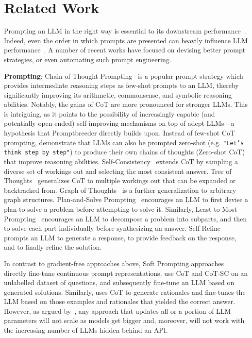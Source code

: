 \documentclass{article} %
\newcommand{\prompt}[1]{\footnotesize{\texttt{"#1"}}\normalsize}
\begin{document}
\section{Related Work}


Prompting an LLM in the right way is essential to its downstream performance~\citep{DBLP:conf/emnlp/MoradiS21,DBLP:journals/corr/abs-2209-07686,zhou2022large}. Indeed, even the order in which prompts are presented can heavily influence LLM performance~\citep{DBLP:conf/acl/LuBM0S22}. A number of recent works have focused on devising better prompt strategies, or even automating such prompt engineering.

\textbf{Prompting}:
Chain-of-Thought Prompting~\citep[CoT,][]{DBLP:conf/nips/Wei0SBIXCLZ22} is a popular prompt strategy which provides intermediate reasoning steps as few-shot prompts to an LLM, thereby significantly improving its arithmetic, commonsense, and symbolic reasoning abilities. Notably, the gains of CoT are more pronounced for stronger LLMs. This is intriguing, as it points to the possibility of increasingly capable (and potentially open-ended) self-improving mechanisms on top of adept LLMs---a hypothesis that Promptbreeder directly builds upon. Instead of few-shot CoT prompting, \cite{DBLP:conf/nips/KojimaGRMI22} demonstrate that LLMs can also be prompted zero-shot (e.g. \prompt{Let's think step by step}) to produce their own chains of thoughts (Zero-shot CoT) that improve reasoning abilities. Self-Consistency~\citep[CoT-SC,][]{wang2022self} extends CoT by sampling a diverse set of workings out and selecting the most consistent answer. Tree of Thoughts~\citep[ToT,][]{yao2023tree} generalizes CoT to multiple workings out that can be expanded or backtracked from. Graph of Thoughts~\citep[GoT,][]{DBLP:journals/corr/abs-2308-09687} is a further generalization to arbitrary graph structures. Plan-and-Solve Prompting~\citep[PS,][]{DBLP:conf/acl/WangXLHLLL23} encourages an LLM to first devise a plan to solve a problem before attempting to solve it. Similarly, Least-to-Most Prompting~\citep{zhou2022least} encourages an LLM to decompose a problem into subparts, and then to solve each part individually before synthesizing an answer. Self-Refine~\citep{DBLP:journals/corr/abs-2303-17651} prompts an LLM to generate a response, to provide feedback on the response, and to finally refine the solution.

In contrast to gradient-free approaches above, Soft Prompting approaches~\citep[e.g.,][]{DBLP:journals/corr/abs-2103-10385,qin2021learning,DBLP:conf/emnlp/LesterAC21} directly fine-tune continuous prompt representations. \citet{DBLP:journals/corr/abs-2210-11610} use CoT and CoT-SC on an unlabelled dataset of questions, and subsequently fine-tune an LLM based on generated solutions. Similarly, \citet{DBLP:conf/nips/ZelikmanWMG22} uses CoT to generate rationales and fine-tunes the LLM based on those examples and rationales that yielded the correct answer. However, as argued by~\citet{zhou2022large}, any approach that updates all or a portion of LLM parameters will not scale as models get bigger and, moreover, will not work with the increasing number of LLMs hidden behind an API.
\end{document}

